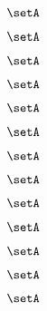 \begin{forslides}
    \begin{equation}
        \label{eq:slides-translation-16}
        \setA
    \end{equation}

    \begin{equation}
        \label{eq:slides-translation-17}
        \setA
    \end{equation}

    \begin{equation}
        \label{eq:slides-translation-18}
        \setA
    \end{equation}

    \begin{equation}
        \label{eq:slides-translation-19}
        \setA
    \end{equation}
    
    \begin{equation}
        \label{eq:slides-translation-20}
        \setA
    \end{equation}

    \begin{equation}
        \label{eq:slides-translation-21}
        \setA
    \end{equation}

    \begin{equation}
        \label{eq:slides-translation-22}
        \setA
    \end{equation}

    \begin{equation}
        \label{eq:slides-translation-23}
        \setA
    \end{equation}

    \begin{equation}
        \label{eq:slides-translation-24}
        \setA
    \end{equation}

    \begin{equation}
        \label{eq:slides-translation-25}
        \setA
    \end{equation}

    \begin{equation}
        \label{eq:slides-translation-26}
        \setA
    \end{equation}

    \begin{equation}
        \label{eq:slides-translation-27}
        \setA
    \end{equation}

    \begin{equation}
        \label{eq:slides-translation-28}
        \setA
    \end{equation}


\end{forslides}
